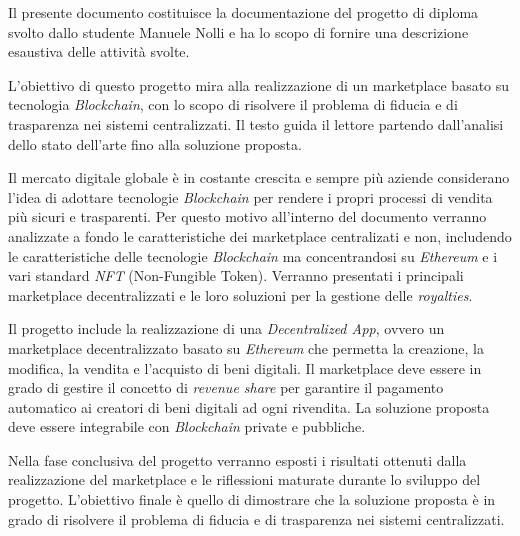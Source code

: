 
Il presente documento costituisce la documentazione del progetto di diploma svolto dallo studente Manuele Nolli e ha lo scopo di fornire una descrizione esaustiva delle attività svolte.

\vspace{5mm} %
L'obiettivo di questo progetto mira alla realizzazione di un marketplace basato su tecnologia \textit{Blockchain}, con lo scopo di risolvere il problema di fiducia e di trasparenza nei sistemi centralizzati. Il testo guida il lettore partendo dall'analisi dello stato dell'arte fino alla soluzione proposta. 

\vspace{5mm} %
Il mercato digitale globale è in costante crescita e sempre più aziende considerano l'idea di adottare tecnologie \textit{Blockchain} per rendere i propri processi di vendita più sicuri e trasparenti. Per questo motivo all'interno del documento verranno analizzate a fondo le caratteristiche dei marketplace centralizati e non, includendo le caratteristiche delle tecnologie \textit{Blockchain} ma concentrandosi su \textit{Ethereum} e i vari standard \textit{NFT} (Non-Fungible Token). Verranno presentati i principali marketplace decentralizzati e le loro soluzioni per la gestione delle \textit{royalties}.

\vspace{5mm} %
Il progetto include la realizzazione di una \textit{Decentralized App}, ovvero un marketplace decentralizzato basato su \textit{Ethereum} che permetta la creazione, la modifica, la vendita e l'acquisto di beni digitali. Il marketplace deve essere in grado di gestire il concetto di \textit{revenue share} per garantire il pagamento automatico ai creatori di beni digitali ad ogni rivendita. La soluzione proposta deve essere integrabile con \textit{Blockchain} private e pubbliche.


\vspace{5mm} %
Nella fase conclusiva del progetto verranno esposti i risultati ottenuti dalla realizzazione del marketplace e le riflessioni maturate durante lo sviluppo del progetto. L'obiettivo finale è quello di dimostrare che la soluzione proposta è in grado di risolvere il problema di fiducia e di trasparenza nei sistemi centralizzati. 



